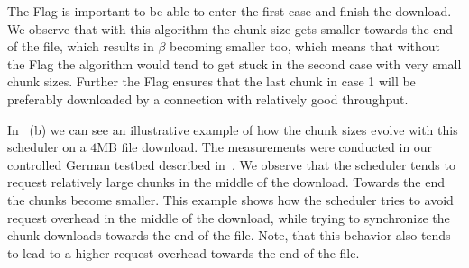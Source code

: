 The  Flag is important to be able to enter the first case and finish the download. 
We observe that with this algorithm the chunk size gets smaller towards the end of the file, which results in $\beta$ becoming smaller too, which means that without the  Flag the algorithm would tend to get stuck in the second case with very small chunk sizes. 
Further the  Flag ensures that the last chunk in case 1 will be preferably downloaded by a connection with relatively good throughput.

In~ (b) we can see an illustrative example of how the chunk sizes evolve with this scheduler on a $4$MB file download. 
The measurements were conducted in our controlled German testbed described in~.
We observe that the scheduler tends to request relatively large chunks in the middle of the download. 
Towards the end the chunks become smaller. 
This example shows how the scheduler tries to avoid request overhead in the middle of the download, while trying to synchronize the chunk downloads towards the end of the file. 
Note, that this behavior also tends to lead to a higher request overhead towards the end of the file. 

